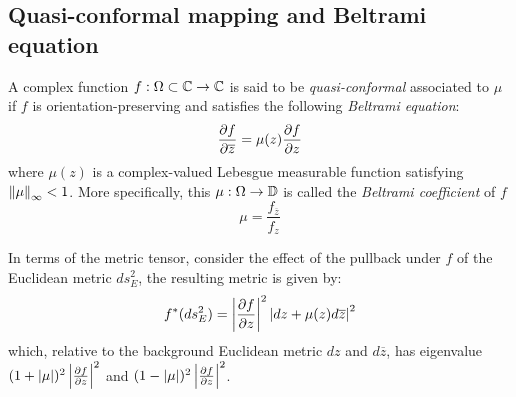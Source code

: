 \documentclass[review,onefignum,onetabnum]{siamonline190516}
\begin{document}
    \subsection{Quasi-conformal mapping and Beltrami equation}
        A complex function $f: \Omega \subset \mathbb{C} \rightarrow \mathbb{C}$ is said to be \textit{quasi-conformal} associated to $\mu$ if $f$ is orientation-preserving and satisfies the following \textit{Beltrami equation}:
        \begin{equation}\label{beltrami eq}
            \Part{f}{\overline{z}} = \mu(z) \Part{f}{z}
        \end{equation}
        where $\mu(z)$ is a complex-valued Lebesgue measurable function satisfying $\left\Vert \mu \right\Vert_\infty < 1$. More specifically, this $\mu: \Omega \rightarrow \mathbb{D}$ is called the \textit{Beltrami coefficient} of $f$
        \begin{equation}\label{mu def}
            \mu = \frac{f_{\overline{z}}}{f_{z}}
        \end{equation}
        
        In terms of the metric tensor, consider the effect of the pullback under $f$ of the Euclidean metric $ds^2_E$, the resulting metric is given by:
        \begin{equation}
            f^*(ds^2_E) = \left\vert \frac{\partial f}{\partial z} \right\vert^2 \left\vert dz + \mu(z)d\overline{z} \right\vert^2
        \end{equation}
        which, relative to the background Euclidean metric $dz$ and $d\overline{z}$, has eigenvalue $(1+\left\vert \mu \right\vert)^2 \left\vert \frac{\partial f}{\partial z} \right\vert^2$ and $(1-\left\vert \mu \right\vert)^2 \left\vert \frac{\partial f}{\partial z} \right\vert^2$. 
\end{document}
